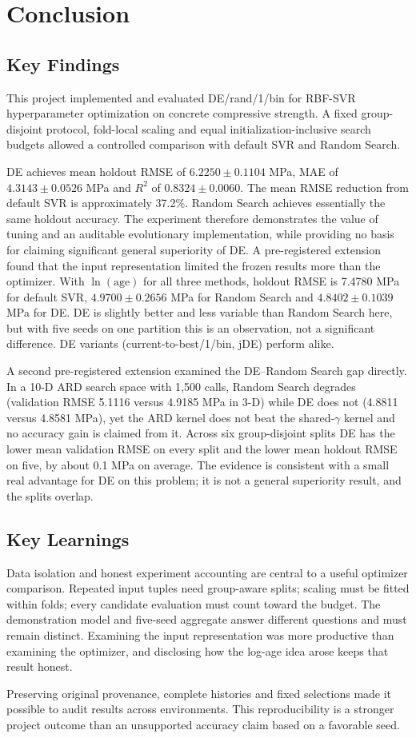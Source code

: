\chapter{Conclusion}
\section{Key Findings}
This project implemented and evaluated DE/rand/1/bin for RBF-SVR hyperparameter optimization on concrete compressive strength. A fixed group-disjoint protocol, fold-local scaling and equal initialization-inclusive search budgets allowed a controlled comparison with default SVR and Random Search.

DE achieves mean holdout RMSE of $6.2250\pm0.1104$ MPa, MAE of $4.3143\pm0.0526$ MPa and $R^2$ of $0.8324\pm0.0060$. The mean RMSE reduction from default SVR is approximately 37.2\%. Random Search achieves essentially the same holdout accuracy. The experiment therefore demonstrates the value of tuning and an auditable evolutionary implementation, while providing no basis for claiming significant general superiority of DE.
A pre-registered extension found that the input representation limited the frozen results more than the optimizer. With $\ln(\text{age})$ for all three methods, holdout RMSE is 7.4780 MPa for default SVR, $4.9700\pm0.2656$ MPa for Random Search and $4.8402\pm0.1039$ MPa for DE. DE is slightly better and less variable than Random Search here, but with five seeds on one partition this is an observation, not a significant difference. DE variants (current-to-best/1/bin, jDE) perform alike.

A second pre-registered extension examined the DE--Random Search gap directly. In a 10-D ARD search space with 1{,}500 calls, Random Search degrades (validation RMSE 5.1116 versus 4.9185 MPa in 3-D) while DE does not (4.8811 versus 4.8581 MPa), yet the ARD kernel does not beat the shared-$\gamma$ kernel and no accuracy gain is claimed from it. Across six group-disjoint splits DE has the lower mean validation RMSE on every split and the lower mean holdout RMSE on five, by about 0.1 MPa on average. The evidence is consistent with a small real advantage for DE on this problem; it is not a general superiority result, and the splits overlap.
\section{Key Learnings}
Data isolation and honest experiment accounting are central to a useful optimizer comparison. Repeated input tuples need group-aware splits; scaling must be fitted within folds; every candidate evaluation must count toward the budget. The demonstration model and five-seed aggregate answer different questions and must remain distinct. Examining the input representation was more productive than examining the optimizer, and disclosing how the log-age idea arose keeps that result honest.

Preserving original provenance, complete histories and fixed selections made it possible to audit results across environments. This reproducibility is a stronger project outcome than an unsupported accuracy claim based on a favorable seed.
